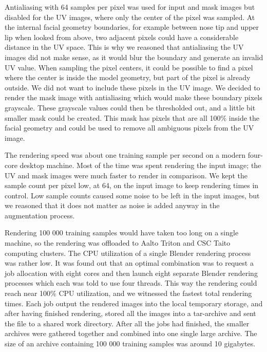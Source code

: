 Antialiasing with 64 samples per pixel was used for input and mask images but disabled for the UV images, where only the center of the pixel was sampled. At the internal facial geometry boundaries, for example between nose tip and upper lip when looked from above, two adjacent pixels could have a considerable distance in the UV space. This is why we reasoned that antialiasing the UV images did not make sense, as it would blur the boundary and generate an invalid UV value. When sampling the pixel centers, it could be possible to find a pixel where the center is inside the model geometry, but part of the pixel is already outside. We did not want to include these pixels in the UV image. We decided to render the mask image with antialiasing which would make these boundary pixels grayscale. These grayscale values could then be thresholded out, and a little bit smaller mask could be created. This mask has pixels that are all 100\% inside the facial geometry and could be used to remove all ambiguous pixels from the UV image.

The rendering speed was about one training sample per second on a modern four-core desktop machine. Most of the time was spent rendering the input image; the UV and mask images were much faster to render in comparison. We kept the sample count per pixel low, at 64, on the input image to keep rendering times in control. Low sample counts caused some noise to be left in the input images, but we reasoned that it does not matter as noise is added anyway in the augmentation process.

Rendering 100 000 training samples would have taken too long on a single machine, so the rendering was offloaded to Aalto Triton and \ac{CSC} Taito computing clusters. The \ac{CPU} utilization of a single Blender rendering process was rather low. It was found out that an optimal combination was to request a job allocation with eight cores and then launch eight separate Blender rendering processes which each was told to use four threads. This way the rendering could reach near 100\% \ac{CPU} utilization, and we witnessed the fastest total rendering times. Each job output the rendered images into the local temporary storage, and after having finished rendering, stored all the images into a tar-archive and sent the file to a shared work directory. After all the jobs had finished, the smaller archives were gathered together and combined into one single large archive. The size of an archive containing 100 000 training samples was around 10 gigabytes.

